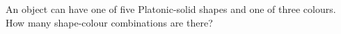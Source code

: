 An object can have one of five Platonic-solid shapes and one of three colours. How many shape-colour combinations are there?
